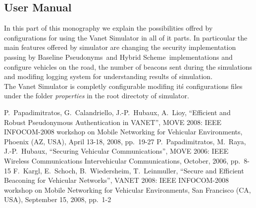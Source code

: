 \documentclass[a4paper,12pt]{article}
\def\baseline{Baseline Pseudonyms~}
\def\hybrid{Hybrid Scheme~}
\begin{document}
\subsection{User Manual}
In this part of this monography we explain the possibilities offred by configurations for using the Vanet Simulator in all of it parts. In particoular the main features offered by simulator are changing the security implementation passing by \baseline and \hybrid implementations and configure vehicles on the road, the number of beacons sent during the simulations and modifing logging system for understanding results of simulation.\\
The Vanet Simulator is completly configurable modifing it\'s configurations files under the folder \textit{properties} in the root directoty of simulator.


\begin{thebibliography}{99}
%
%
P.~Papadimitratos, G.~Calandriello, J.-P.~Hubaux, A.~Lioy,
``Efficient and Robust Pseudonymous Authentication in VANET'',
MOVE 2008: IEEE INFOCOM-2008 workshop on Mobile Networking for Vehicular Environments,
Phoenix (AZ, USA), April 13-18, 2008, pp.~19-27 
P.~Papadimitratos, M.~Raya, J.-P.~Hubaux,
``Securing Vehicular Communications'',
MOVE 2006: IEEE Wireless Communications Intervehicular Communications,
October, 2006, pp.~8-15 
F.~Kargl, E.~Schoch, B.~Wiedersheim, T.~Leinmuller,
``Secure and Efficient Beaconing for Vehicular Networks'',
VANET 2008: IEEE INFOCOM-2008 workshop on Mobile Networking for Vehicular Environments,
San Francisco (CA, USA), September 15, 2008, pp.~1-2 
\end{thebibliography}
\end{document}

